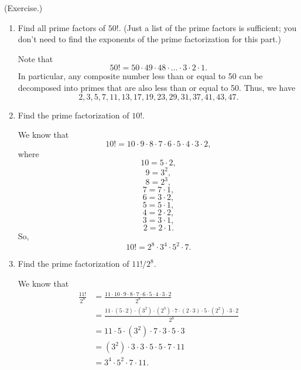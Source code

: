 \documentclass[letterpaper]{article}
\begin{document}
\begin{mdframed}
    (Exercise.) 
    \begin{enumerate}
        \item Find all prime factors of $50!$. (Just a list of the prime factors is sufficient; you don't need to find the exponents of the prime factorization for this part.)
        \begin{mdframed}
            Note that \[50! = 50 \cdot 49 \cdot 48 \cdot \hdots \cdot 3 \cdot 2 \cdot 1.\]
            In particular, any composite number less than or equal to 50 can be decomposed into primes that are also less than or equal to 50. Thus, we have \[2, 3, 5, 7, 11, 13, 17, 19, 23, 29, 31, 37, 41, 43, 47.\] 
        \end{mdframed}
        \item Find the prime factorization of $10!$. 
        \begin{mdframed}
            We know that 
            \[10! = 10 \cdot 9 \cdot 8 \cdot 7 \cdot 6 \cdot 5 \cdot 4 \cdot 3 \cdot 2,\]
            where 
            \[10 = 5 \cdot 2,\]
            \[9 = 3^2,\]
            \[8 = 2^3,\]
            \[7 = 7 \cdot 1,\]
            \[6 = 3 \cdot 2,\]
            \[5 = 5 \cdot 1,\]
            \[4 = 2 \cdot 2,\]
            \[3 = 3 \cdot 1,\]
            \[2 = 2 \cdot 1.\]
            So, 
            \[10! = 2^8 \cdot 3^4 \cdot 5^2 \cdot 7.\]
        \end{mdframed}
        \item Find the prime factorization of $11! / 2^8$. 
        \begin{mdframed}
            We know that
            \begin{equation*}
                \begin{aligned}
                    \frac{11!}{2^8} &= \frac{11 \cdot 10 \cdot 9 \cdot 8 \cdot 7 \cdot 6 \cdot 5 \cdot 4 \cdot 3 \cdot 2}{2^8} \\ 
                        &= \frac{11 \cdot (5 \cdot 2) \cdot (3^2) \cdot (2^3) \cdot 7 \cdot (2 \cdot 3) \cdot 5 \cdot (2^2) \cdot 3 \cdot 2}{2^8} \\ 
                        &= 11 \cdot 5 \cdot (3^2) \cdot 7 \cdot 3 \cdot 5 \cdot 3 \\ 
                        &= (3^2) \cdot 3 \cdot 3 \cdot 5 \cdot 5 \cdot 7 \cdot 11 \\ 
                        &= 3^4 \cdot 5^2 \cdot 7 \cdot 11.
                \end{aligned}
            \end{equation*}

\end{mdframed}
\end{enumerate}
\end{mdframed}
\end{document}
